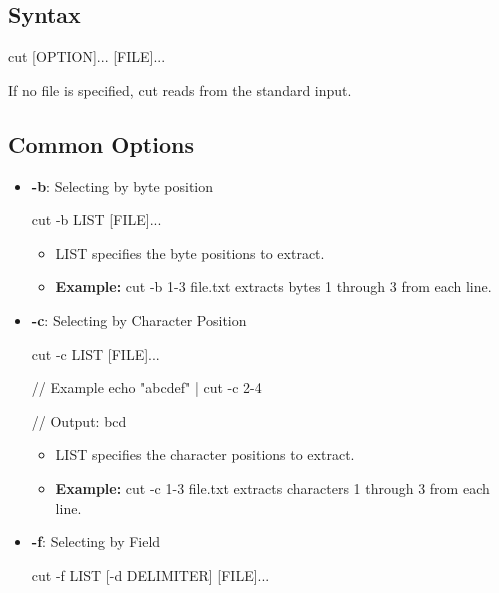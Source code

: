 \documentclass{report}
\begin{document}
    \subsection{Syntax}
    \bigbreak \noindent 
    \begin{bashcode}
    cut [OPTION]... [FILE]...
    \end{bashcode}
    \bigbreak \noindent 
    If no file is specified, cut reads from the standard input.
    \bigbreak \noindent 
    \subsection{Common Options}
    \bigbreak \noindent 
    \begin{itemize}
        \item \textbf{-b}: Selecting by byte position
            \bigbreak \noindent 
            \begin{bashcode}
                cut -b LIST [FILE]...
            \end{bashcode}
            \begin{itemize}
                \item LIST specifies the byte positions to extract.
                \item \textbf{Example:} cut -b 1-3 file.txt extracts bytes 1 through 3 from each line.
            \end{itemize}
        \item \textbf{-c}: Selecting by Character Position
            \bigbreak \noindent 
            \begin{bashcode}
                cut -c LIST [FILE]...

                // Example
                echo "abcdef" | cut -c 2-4

                // Output: bcd
            \end{bashcode}
            \begin{itemize}
                \item LIST specifies the character positions to extract.
                \item \textbf{Example:} cut -c 1-3 file.txt extracts characters 1 through 3 from each line.
            \end{itemize}
        \item \textbf{-f}: Selecting by Field
            \bigbreak \noindent 
            \begin{bashcode}
            cut -f LIST [-d DELIMITER] [FILE]...
             

\end{bashcode}
\end{itemize}
\end{document}

